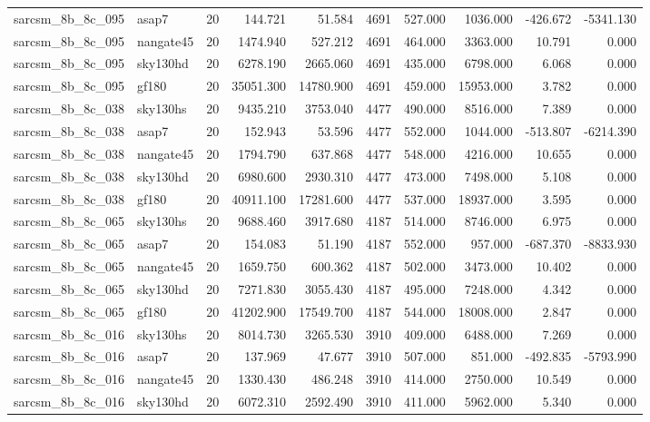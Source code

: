 \begin{tabular}{llrrrrrrrr}
sarcsm\_8b\_8c\_095 & asap7 & 20 & 144.721 & 51.584 & 4691 & 527.000 & 1036.000 & -426.672 & -5341.130 \\
sarcsm\_8b\_8c\_095 & nangate45 & 20 & 1474.940 & 527.212 & 4691 & 464.000 & 3363.000 & 10.791 & 0.000 \\
sarcsm\_8b\_8c\_095 & sky130hd & 20 & 6278.190 & 2665.060 & 4691 & 435.000 & 6798.000 & 6.068 & 0.000 \\
sarcsm\_8b\_8c\_095 & gf180 & 20 & 35051.300 & 14780.900 & 4691 & 459.000 & 15953.000 & 3.782 & 0.000 \\
sarcsm\_8b\_8c\_038 & sky130hs & 20 & 9435.210 & 3753.040 & 4477 & 490.000 & 8516.000 & 7.389 & 0.000 \\
sarcsm\_8b\_8c\_038 & asap7 & 20 & 152.943 & 53.596 & 4477 & 552.000 & 1044.000 & -513.807 & -6214.390 \\
sarcsm\_8b\_8c\_038 & nangate45 & 20 & 1794.790 & 637.868 & 4477 & 548.000 & 4216.000 & 10.655 & 0.000 \\
sarcsm\_8b\_8c\_038 & sky130hd & 20 & 6980.600 & 2930.310 & 4477 & 473.000 & 7498.000 & 5.108 & 0.000 \\
sarcsm\_8b\_8c\_038 & gf180 & 20 & 40911.100 & 17281.600 & 4477 & 537.000 & 18937.000 & 3.595 & 0.000 \\
sarcsm\_8b\_8c\_065 & sky130hs & 20 & 9688.460 & 3917.680 & 4187 & 514.000 & 8746.000 & 6.975 & 0.000 \\
sarcsm\_8b\_8c\_065 & asap7 & 20 & 154.083 & 51.190 & 4187 & 552.000 & 957.000 & -687.370 & -8833.930 \\
sarcsm\_8b\_8c\_065 & nangate45 & 20 & 1659.750 & 600.362 & 4187 & 502.000 & 3473.000 & 10.402 & 0.000 \\
sarcsm\_8b\_8c\_065 & sky130hd & 20 & 7271.830 & 3055.430 & 4187 & 495.000 & 7248.000 & 4.342 & 0.000 \\
sarcsm\_8b\_8c\_065 & gf180 & 20 & 41202.900 & 17549.700 & 4187 & 544.000 & 18008.000 & 2.847 & 0.000 \\
sarcsm\_8b\_8c\_016 & sky130hs & 20 & 8014.730 & 3265.530 & 3910 & 409.000 & 6488.000 & 7.269 & 0.000 \\
sarcsm\_8b\_8c\_016 & asap7 & 20 & 137.969 & 47.677 & 3910 & 507.000 & 851.000 & -492.835 & -5793.990 \\
sarcsm\_8b\_8c\_016 & nangate45 & 20 & 1330.430 & 486.248 & 3910 & 414.000 & 2750.000 & 10.549 & 0.000 \\
sarcsm\_8b\_8c\_016 & sky130hd & 20 & 6072.310 & 2592.490 & 3910 & 411.000 & 5962.000 & 5.340 & 0.000 \\

\end{tabular}
